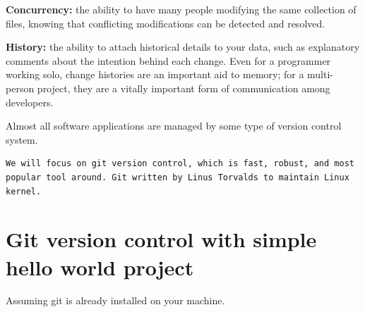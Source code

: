 \documentclass[letterpaper,10pt,english]{sphinxmanual}
\begin{document}
\textbf{Concurrency:} the ability to have many people modifying the same collection
of files, knowing that conflicting modifications can be detected and resolved.

\textbf{History:} the ability to attach historical details to your data, such as
explanatory comments about the intention behind each change. Even for a
programmer working solo, change histories are an important aid to memory;
for a multi-person project, they are a vitally important form of communication
among developers.

Almost all software applications are managed by some type of version
control system.

\begin{Verbatim}[commandchars=\\\{\}]
We will focus on git version control, which is fast, robust, and most
popular tool around. Git written by Linus Torvalds to maintain Linux
kernel.
\end{Verbatim}

\begin{DUlineblock}{0em}
\item[] 
\item[] 
\end{DUlineblock}


\chapter{Git version control with simple hello world project}
\label{version-control:git-version-control-with-simple-hello-world-project}
Assuming git is already installed on your machine.
\end{document}
